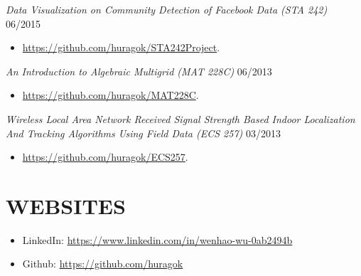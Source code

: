 \documentclass[margin]{res} %
\begin{document}
\begin{resume}
        {\sl Data Visualization on Community Detection of Facebook Data (STA
        242)} \hfill 06/2015
        \begin{itemize} 
            \item \url{https://github.com/huragok/STA242Project}.
        \end{itemize}
        
        {\sl An Introduction to Algebraic Multigrid (MAT 228C)}
        \hfill 06/2013
        \begin{itemize} 
            \item \url{https://github.com/huragok/MAT228C}.
        \end{itemize}
        
        {\sl Wireless Local Area Network Received Signal
        Strength Based Indoor Localization And Tracking Algorithms Using Field
        Data (ECS 257)} \hfill 03/2013
        \begin{itemize} 
            \item \url{https://github.com/huragok/ECS257}.
        \end{itemize}
        
        
       
    
    
        \section{WEBSITES} 
        \begin{itemize}
            \item LinkedIn: \url{https://www.linkedin.com/in/wenhao-wu-0ab2494b}
            \item Github: \url{https://github.com/huragok}
        \end{itemize}
        

\end{resume}
\end{document}
